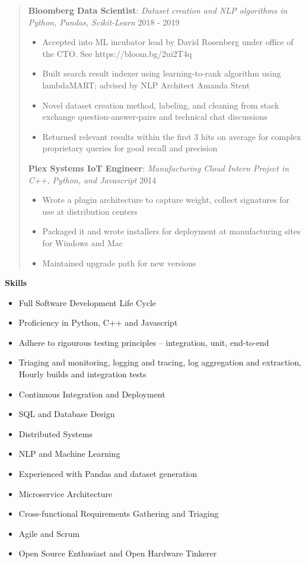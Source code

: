 \documentclass[11pt,a4paper]{article}
\begin{document}
\begin{quote}
\textbf{Bloomberg Data Scientist}: \emph{Dataset creation and NLP
algorithms in Python, Pandas, Scikit-Learn} 2018 - 2019
\begin{itemize}
\item Accepted into
ML incubator lead by David Rosenberg under office of the CTO. See
https://bloom.bg/2ui2T4q
\item Built search result indexer using
learning-to-rank algorithm using lambdaMART; advised by NLP Architect
Amanda Stent
\item Novel dataset creation method, labeling, and cleaning from stack
exchange question-answer-pairs and technical chat discussions
\item Returned relevant results within the first 3 hits on average for complex
proprietary queries for good recall and precision
\end{itemize}

\textbf{Plex Systems IoT Engineer}: \emph{Manufacturing Cloud Intern
Project in C++, Python, and Javascript} 2014
\begin{itemize}
\item Wrote a plugin architecture to
capture weight, collect signatures for use at distribution centers
\item Packaged it and wrote installers for deployment at manufacturing sites
for Windows and Mac
\item Maintained upgrade path for new versions
\end{itemize}
\end{quote}

\textbf{Skills}
\begin{itemize}
\item Full Software Development Life Cycle
\item Proficiency in Python, C++ and Javascript
\item Adhere to rigourous testing principles -- integration, unit,
end-to-end
\item Triaging and monitoring, logging and tracing, log aggregation and
extraction, Hourly builds and integration tests
\item Continuous Integration and Deployment
\item SQL and Database Design
\item Distributed Systems
\item NLP and Machine Learning
\item Experienced with Pandas and dataset generation
\item Microservice Architecture
\item Cross-functional Requirements Gathering and Triaging
\item Agile and Scrum
\item Open Source Enthusiast and Open Hardware Tinkerer
\end{itemize}
\end{document}
